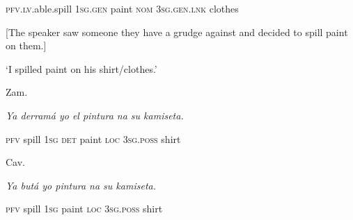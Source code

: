 \begin{stylelsIMT}
\textsc{pfv}.\textsc{lv}.able.spill \textsc{1sg.gen }paint\textsc{ nom }3\textsc{sg.gen.lnk} clothes
\end{stylelsIMT}

\begin{listWWNumiileveli}
\item 
\begin{stylelsLanginfo}
\label{bkm:Ref52816675}[The speaker saw someone they have a grudge against and decided to spill paint on them.]
\end{stylelsLanginfo}
\end{listWWNumiileveli}
\begin{stylelsLanginfo}
‘I spilled paint on his shirt/clothes.’
\end{stylelsLanginfo}

\begin{listWWNumiileveli}
\item 
\begin{listWWNumiilevelii}
\item 
\begin{stylelsLanginfo}
Zam.
\end{stylelsLanginfo}
\end{listWWNumiilevelii}
\end{listWWNumiileveli}
\begin{stylelsLanginfo}
\textit{Ya derram\'{a} yo el pintura na su kamiseta.}
\end{stylelsLanginfo}

\begin{stylelsIMT}
\textsc{pfv }spill 1\textsc{sg det }paint\textsc{ loc }3\textsc{sg.poss }shirt
\end{stylelsIMT}

\begin{listWWNumiileveli}
\item 
\begin{listWWNumiilevelii}
\item 
\begin{stylelsLanginfo}
Cav.
\end{stylelsLanginfo}
\end{listWWNumiilevelii}
\end{listWWNumiileveli}
\begin{stylelsIMT}
\textit{Ya but\'{a} yo pintura na su kamiseta.}
\end{stylelsIMT}

\begin{stylelsIMT}
\textsc{pfv} spill \textsc{1sg} paint \textsc{loc }3\textsc{sg.poss }shirt
\end{stylelsIMT}

